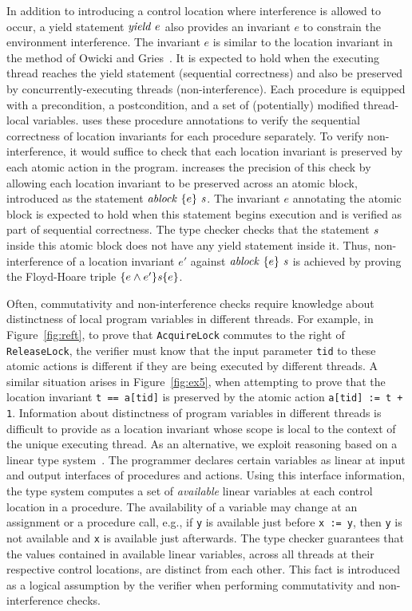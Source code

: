 In addition to introducing a control location where interference is allowed to occur, 
a yield statement $\mathit{yield}\ e$ also provides an invariant $e$ 
to constrain the environment interference.
The invariant $e$ is similar to the location invariant in the method of Owicki and Gries~\cite{OwickiG76}.
It is expected to hold when the executing thread reaches the yield statement (sequential correctness) 
and also be preserved by concurrently-executing threads (non-interference).
Each procedure is equipped with a precondition, a postcondition,
and a set of (potentially) modified thread-local variables.
\civl uses these procedure annotations to verify the sequential correctness of location invariants for each
procedure separately.
To verify non-interference, it would suffice to check that each location invariant is preserved by each atomic action in the program.
\civl increases the precision of this check by allowing each location invariant to be preserved across 
an atomic block, introduced as the statement $\mathit{ablock}\ {\{e\}}\ {\mathit{s}}$.
The invariant $e$ annotating the atomic block is expected to hold when this statement begins execution and is verified as part of sequential correctness.
The \civl type checker checks that the statement $\mathit{s}$ inside this atomic block does not have any yield statement inside it.
Thus, non-interference of a location invariant $e'$ against $\mathit{ablock}\ {\{e\}}\ {\mathit{s}}$ is achieved by proving the Floyd-Hoare triple $\{e \wedge e'\}\mathit{s}\{e\}$.

Often, commutativity and non-interference checks require knowledge about distinctness of local program variables in different threads.
For example, in Figure~\ref{fig:reft}, to prove that {\tt AcquireLock} commutes to the right of {\tt ReleaseLock}, the verifier must know
that the input parameter {\tt tid} to these atomic actions is different if they are being executed by different threads.
A similar situation arises in Figure~\ref{fig:ex5}, when attempting to prove that the location invariant {\tt t == a[tid]} is preserved by the atomic 
action {\tt a[tid] := t + 1}. 
Information about distinctness of program variables in different threads is difficult to provide as a location invariant 
whose scope is local to the context of the unique executing thread.
As an alternative, we exploit reasoning based on a linear type system~\cite{Wadler90lineartypes}.
The programmer declares certain variables as linear at input and output interfaces of procedures and actions.
Using this interface information, the \civl type system computes a set of {\em available\/} linear variables at each control location 
in a procedure.
The availability of a variable may change at an assignment or a procedure call, e.g., 
if {\tt y} is available just before {\tt x := y}, then {\tt y} is not available and {\tt x} is available just afterwards.
The \civl type checker guarantees that the values contained in available linear variables, across all threads at their respective control locations, are 
distinct from each other.
This fact is introduced as a logical assumption by the verifier when performing commutativity and non-interference checks.

